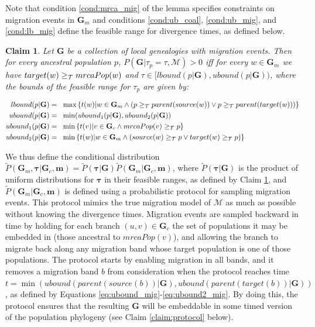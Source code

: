 \documentclass[11pt]{article}
\newcommand{\vect}[1]{\boldsymbol{\mathbf{#1}}}
\newcommand{\M}{\mathcal{M}}
\newcommand{\G}{\vect{G}}
\newcommand{\Pref}{\widetilde{P}}
\newcommand{\1}{\mathbbm{1}}
\newcommand{\Gc}{\G_c}
\newcommand{\Gm}{\G_m}
\newtheorem{claim}{Claim}
\newcommand{\taus}{\vect\tau}
\newcommand{\migs}{\vect{m}}
\begin{document}
Note that condition \ref{cond:mrca_mig} of the lemma specifies constraints on migration events in $\Gm$ and conditions \ref{cond:ub_coal}, \ref{cond:ub_mig}, and \ref{cond:lb_mig}
define the feasible range for divergence times, as defined below.
%
%
\begin{claim}\label{claim:tau_bound_mig}
 Let $\G$ be a  collection of local genealogies with migration events. Then for every ancestral population $p$, $P(\G|\tau_p=\tau,\M)>0$ iff for every $w\in\Gm$ we have $target(w)\geq_{\mathcal{T}} mrcaPop(w)$
 and   $\tau \in [lbound(p|\G) , ubound(p|\G) )$, where the bounds of the feasible range for $\tau_p$
 are given by:
 \begin{small}
 \begin{align}
  lbound(p|\G)   =~~ & \max\left\{t(w)| w\in \Gm \wedge ( p\anc parent(source(w)) \vee p\anc parent(target(w))) \right\} \label{eq:lbound_mig}\\
  ubound(p|\G)   =~~ & \min(ubound_1(p|\G) , ubound_2(p|\G)) \label{eq:ubound_mig}  \\
  ubound_1(p|\G) =~~ & \min\left\{t(v)| v\in \Gc \wedge mrcaPop(v)\anc p\right\} \label{eq:ubound1_mig}\\
  ubound_2(p|\G) =~~ & \min\left\{t(w)| w\in \Gm \wedge ( source(w)\anc p \vee target(w)\anc p) \right\} \label{eq:ubound2_mig} %
 \end{align}
 \end{small}
\end{claim}

We thus define the conditional distribution $\Pref(\Gm,\taus|\Gc,\migs)=\Pref(\taus|\G)\Pref(\Gm|\Gc,\migs)$,
where $\Pref(\taus|\G)$ is the product of uniform distributions for $\taus$ in their feasible ranges, as defined by Claim \ref{claim:tau_bound_mig},
and $\Pref(\Gm|\Gc,\migs)$ is defined using a probabilistic protocol for sampling migration events.
%
This protocol mimics the true migration model of $\M$ as much as possible without knowing the divergence times.
%
Migration events are sampled backward in time by holding for each branch $(u,v)\in\Gc$ the set of populations it may be embedded in (those ancestral to $mrcaPop(v)$),
and allowing the branch to migrate back along any migration band whose target population is one of those populations.
%
The protocol starts by enabling migration in all bands, and it removes a migration band $b$ from consideration when the protocol reaches time
$t=\min\left(ubound(parent(source(b))|\G),ubound(parent(target(b))|\G)\right)$, as defined by Equations \ref{eq:ubound_mig}-\ref{eq:ubound2_mig}.
%
By doing this, the protocol ensures that the resulting $\G$ will be embeddable in some timed version of the population phylogeny (see Claim \ref{claim:protocol} below).
\end{document}
